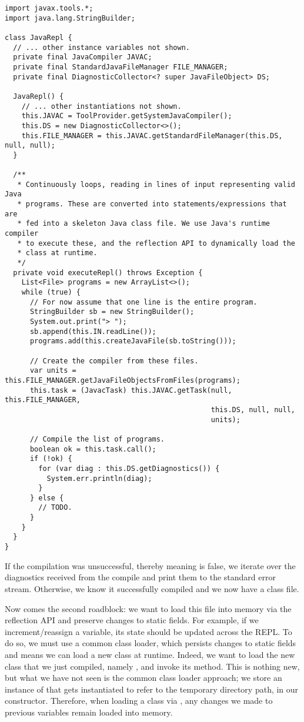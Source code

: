 \begin{lstlisting}[language=MyJava]
import javax.tools.*;
import java.lang.StringBuilder;

class JavaRepl {
  // ... other instance variables not shown.
  private final JavaCompiler JAVAC;
  private final StandardJavaFileManager FILE_MANAGER;
  private final DiagnosticCollector<? super JavaFileObject> DS;

  JavaRepl() {
    // ... other instantiations not shown.
    this.JAVAC = ToolProvider.getSystemJavaCompiler();
    this.DS = new DiagnosticCollector<>();
    this.FILE_MANAGER = this.JAVAC.getStandardFileManager(this.DS, null, null);
  }

  /**
   * Continuously loops, reading in lines of input representing valid Java
   * programs. These are converted into statements/expressions that are 
   * fed into a skeleton Java class file. We use Java's runtime compiler 
   * to execute these, and the reflection API to dynamically load the 
   * class at runtime.
   */
  private void executeRepl() throws Exception {
    List<File> programs = new ArrayList<>();
    while (true) {
      // For now assume that one line is the entire program.
      StringBuilder sb = new StringBuilder();
      System.out.print("> ");
      sb.append(this.IN.readLine());
      programs.add(this.createJavaFile(sb.toString()));

      // Create the compiler from these files.
      var units = this.FILE_MANAGER.getJavaFileObjectsFromFiles(programs);
      this.task = (JavacTask) this.JAVAC.getTask(null, this.FILE_MANAGER, 
                                                 this.DS, null, null, 
                                                 units);

      // Compile the list of programs.
      boolean ok = this.task.call();
      if (!ok) {
        for (var diag : this.DS.getDiagnostics()) {
          System.err.println(diag);
        }
      } else {
        // TODO.
      }
    }
  }
}
\end{lstlisting}

If the compilation was unsuccessful, thereby meaning  is false, we iterate over the diagnostics received from the compile and print them to the standard error stream. 
Otherwise, we know it successfully compiled and we now have a class file.

Now comes the second roadblock: we want to load this file into memory via the reflection API and preserve changes to static fields. 
For example, if we increment/reassign a variable, its state should be updated across the REPL. 
To do so, we must use a common class loader, which persists changes to static fields and means we can load a new class at runtime. 
Indeed, we want to load the new class that we just compiled, namely , and invoke its  method. 
This is nothing new, but what we have not seen is the common class loader approach; we store an instance of  that gets instantiated to refer to the temporary directory path, in our constructor. 
Therefore, when loading a class via , any changes we made to previous variables remain loaded into memory.

